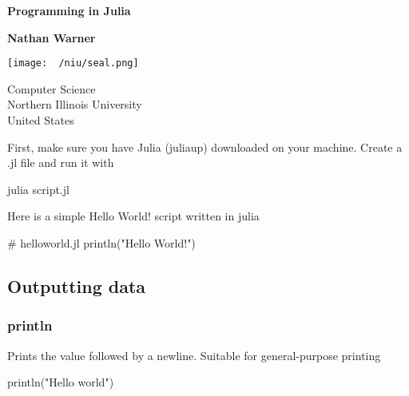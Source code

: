 \documentclass{report}
\title{\Huge{}}
\author{\huge{Nathan Warner}}
\date{\huge{}}
\begin{document}
        \begin{titlepage}
       \begin{center}
           \vspace*{1cm}
    
           \textbf{Programming in Julia}
    
           \vspace{0.5cm}
            
                
           \vspace{1.5cm}
    
           \textbf{Nathan Warner}
    
           \vfill
                
                
           \vspace{0.8cm}
         
           \texttt{[image: ~/niu/seal.png]}
                
           Computer Science \\
           Northern Illinois University\\
           United States\\
           
                
       \end{center}
    \end{titlepage}
    \tableofcontents
    \pagebreak 
    \bigbreak \noindent 
    First, make sure you have Julia (juliaup) downloaded on your machine. Create a .jl file and run it with 
    \bigbreak \noindent 
    \begin{bashcode}
    julia script.jl
    \end{bashcode}
    \bigbreak \noindent 
    Here is a simple Hello World! script written in julia
    \bigbreak \noindent 
    \begin{jlcode}
    # helloworld.jl 
    println("Hello World!")
    \end{jlcode}

    \bigbreak \noindent 
    \subsection{Outputting data}
    \bigbreak \noindent 
    \subsubsection{println}
    \bigbreak \noindent 
    Prints the value followed by a newline. Suitable for general-purpose printing
    \bigbreak \noindent 
    \begin{jlcode}
    println("Hello world")
    \end{jlcode}
    \bigbreak \noindent 
\end{document}

